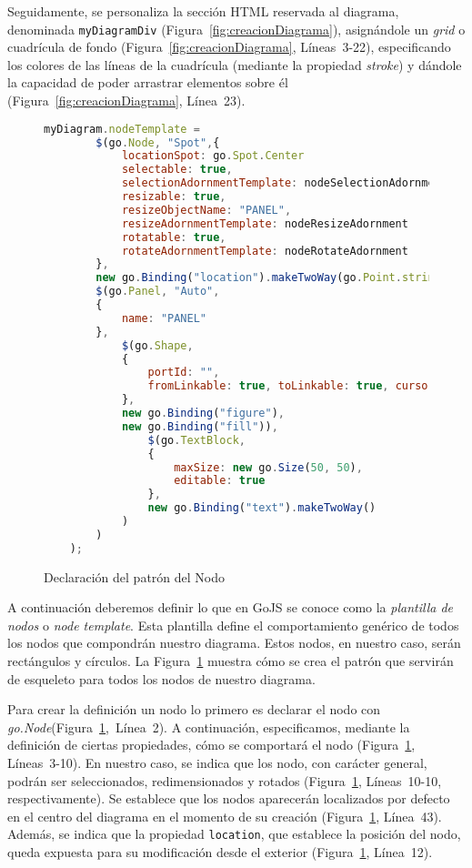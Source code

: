 Seguidamente, se personaliza la sección HTML reservada al diagrama, denominada \texttt{myDiagramDiv} (Figura~\ref{fig:creacionDiagrama}), asignándole un \emph{grid} o cuadrícula de fondo (Figura~\ref{fig:creacionDiagrama}, Líneas~3-22), especificando los colores de las líneas de la cuadrícula (mediante la propiedad \emph{stroke}) y dándole la capacidad de poder arrastrar elementos sobre él (Figura~\ref{fig:creacionDiagrama}, Línea~23).


\begin{figure}[H]
	\centering
	\begin{lstlisting}[language=JavaScript]
	myDiagram.nodeTemplate =
		$(go.Node, "Spot",{ 
			locationSpot: go.Spot.Center 
			selectable: true, 
			selectionAdornmentTemplate: nodeSelectionAdornment  
			resizable: true, 
			resizeObjectName: "PANEL", 
			resizeAdornmentTemplate: nodeResizeAdornment 
			rotatable: true, 
			rotateAdornmentTemplate: nodeRotateAdornment 
		},
		new go.Binding("location").makeTwoWay(go.Point.stringify),
		$(go.Panel, "Auto",
		{ 
			name: "PANEL" 
		},
			$(go.Shape,
			{
				portId: "",
				fromLinkable: true, toLinkable: true, cursor: "pointer",
			},
			new go.Binding("figure"),
			new go.Binding("fill")),
				$(go.TextBlock,
				{
					maxSize: new go.Size(50, 50),
					editable: true
				},
				new go.Binding("text").makeTwoWay()
			)
		)
	);\end{lstlisting}
	\caption{Declaración del patrón del Nodo}
	\label{fig:patronNodo}
\end{figure}

A continuación deberemos definir lo que en GoJS se conoce como la \emph{plantilla de nodos} o \emph{node template}. Esta plantilla define el comportamiento genérico de todos los nodos que compondrán nuestro diagrama. Estos nodos, en nuestro caso, serán rectángulos y círculos. La Figura~\ref{fig:patronNodo} muestra cómo se crea el patrón que servirán de esqueleto para todos los nodos de nuestro diagrama. 



Para crear la definición un nodo lo primero es declarar el nodo con \emph{go.Node}(Figura~\ref{fig:patronNodo},~Línea~2).
A continuación, especificamos, mediante la definición de ciertas propiedades, cómo se comportará el nodo (Figura~\ref{fig:patronNodo}, Líneas~3-10). En nuestro caso, se indica que los nodo, con carácter general, podrán ser seleccionados, redimensionados y rotados (Figura~\ref{fig:patronNodo}, Líneas~10-10, respectivamente). Se establece que los nodos aparecerán localizados por defecto en el centro del diagrama en el momento de su creación (Figura~\ref{fig:patronNodo}, Línea~43).
Además, se indica que la propiedad \texttt{location}, que establece la posición del nodo, queda expuesta para su modificación desde el exterior (Figura~\ref{fig:patronNodo}, Línea~12).

